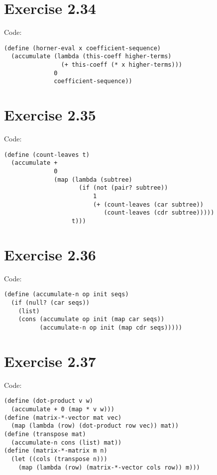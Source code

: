 \documentclass[../main.tex]{subfiles}
\begin{document}
\section{Exercise 2.34}

Code:

\begin{lstlisting}
(define (horner-eval x coefficient-sequence)
  (accumulate (lambda (this-coeff higher-terms)
                (+ this-coeff (* x higher-terms)))
              0
              coefficient-sequence))
\end{lstlisting}

\section{Exercise 2.35}

Code:

\begin{lstlisting}
(define (count-leaves t)
  (accumulate +
              0
              (map (lambda (subtree)
                     (if (not (pair? subtree))
                         1
                         (+ (count-leaves (car subtree))
                            (count-leaves (cdr subtree)))))
                   t)))
\end{lstlisting}

\section{Exercise 2.36}

Code:

\begin{lstlisting}
(define (accumulate-n op init seqs)
  (if (null? (car seqs))
    (list)
    (cons (accumulate op init (map car seqs))
          (accumulate-n op init (map cdr seqs)))))
\end{lstlisting}

\section{Exercise 2.37}

Code:

\begin{lstlisting}
(define (dot-product v w)
  (accumulate + 0 (map * v w)))
(define (matrix-*-vector mat vec)
  (map (lambda (row) (dot-product row vec)) mat))
(define (transpose mat)
  (accumulate-n cons (list) mat))
(define (matrix-*-matrix m n)
  (let ((cols (transpose n)))
    (map (lambda (row) (matrix-*-vector cols row)) m)))
\end{lstlisting}
\end{document}
